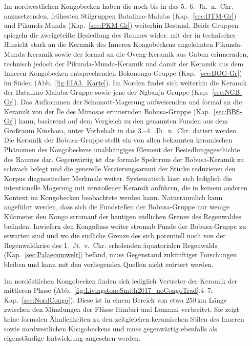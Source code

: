 Im nordwestlichen Kongobecken haben die noch bis in das 5.--6.~Jh.~n.~Chr. anzusetzenden, frühesten Stilgruppen Batalimo-Maluba (Kap.~\ref{sec:BTM-Gr}) und Pikunda-Munda (Kap.~\ref{sec:PKM-Gr}) weiterhin Bestand. Beide Gruppen spiegeln die zweigeteilte Besiedlung des Raumes wider: mit der in technischer Hinsicht stark an die Keramik des Inneren Kongobeckens angelehnten Pikunda-Munda-Keramik sowie der formal an die Oveng-Keramik aus Gabun erinnernden, technisch jedoch der Pikunda-Munda-Keramik und damit der Keramik aus dem Inneren Kongobecken entsprechenden Bokonongo-Gruppe (Kap.~\ref{sec:BOG-Gr}) im Süden (Abb.~\ref{fig:EIA3_Karte}). Im Norden findet sich weiterhin die Keramik der Batalimo-Maluba-Gruppe sowie jene der Ngbanja-Gruppe (Kap.~\ref{sec:NGB-Gr}). Das Aufkommen der Schamott-Magerung aufweisenden und formal an die Keramik von der Île des Mimosas erinnernden Bobusa-Gruppe (Kap.~\ref{sec:BBS-Gr}) kann, basierend auf dem Vergleich zu den genannten Funden aus dem Großraum Kinshasa, unter Vorbehalt in das 3.--4.~Jh.~n.~Chr. datiert werden. Die Keramik der Bobusa-Gruppe stellt ein von allen bekannten keramischen Phänomen des Kongobeckens unabhängiges Element der Besiedlungsgeschichte des Raumes dar. Gegenwärtig ist das formale Spektrum der Bobusa-Keramik zu schwach belegt und die generelle Verzierungsarmut der Stücke reduzieren den Korpus diagnostischer Merkmale weiter. Systematisch lässt sich lediglich die intentionelle Magerung mit zerstoßener Keramik anführen, die in keinem anderen Kontext im Kongobecken beobachtete werden kann. Naturräumlich kann angeführt werden, dass sich die Fundstellen der Bobusa-Gruppe nur wenige Kilometer den Kongo stromauf der heutigen südlichen Grenze des Regenwaldes befinden. Inwiefern den Kongofluss weiter stromab Funde der Bobusa-Gruppe zu erwarten sind und wo die südliche Grenze des sich potentiell noch von der Regenwaldkrise des 1.~Jt.~v.~Chr. erholenden äquatorialen Regenwalds (Kap.~\ref{sec:Palaeoumwelt}) befand, muss Gegenstand zukünftiger Forschungen bleiben und kann mit den vorliegenden Quellen nicht erörtert werden.

Im nordöstlichen Kongobecken finden sich lediglich Vertreter der Keramik der mittleren Phase (Abb.~\ref{fig:LivingstoneSmith2017_noCongoTrad}.4--7; Kap.~\ref{sec:NordCongo}). Diese ist in einem Bereich von etwa 250\,km Länge zwischen den Mündungen der Flüsse Itimbiri und Lomami verbreitet. Sie zeigt keine formalen Ähnlichkeiten zu den zeitgleichen keramischen Stilen des Inneren sowie nordwestlichen Kongobeckens und muss gegenwärtig ebenfalls als eigenständige Entwicklung angesehen werden.

